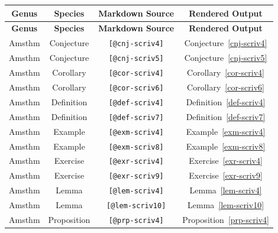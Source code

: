 \documentclass[
  12pt,
  a4paper,
  oneside,
  numbers=noenddot,
  titlepage,
  toclink=all,
  toc=bibliography]{scrbook}
\theoremstyle{definition}
\theoremstyle{definition}
\theoremstyle{definition}
\theoremstyle{plain}
\theoremstyle{plain}
\theoremstyle{plain}
\theoremstyle{plain}
\theoremstyle{plain}
\theoremstyle{remark}
\begin{document}
\hypertarget{tbl-scriv3}{}
\begin{longtable}[]{@{}cccc@{}}
\toprule\noalign{}
\textbf{Genus} & \textbf{Species} & \textbf{Markdown Source} &
\textbf{Rendered Output} \\
\midrule\noalign{}
\endfirsthead
\toprule\noalign{}
\textbf{Genus} & \textbf{Species} & \textbf{Markdown Source} &
\textbf{Rendered Output} \\
\midrule\noalign{}
\endhead
\bottomrule\noalign{}
\endlastfoot
Amsthm & Conjecture & \texttt{{[}@cnj-scriv4{]}} &
\protect\hypertarget{cite_7}{}{\label{cite_7}Conjecture~\ref{cnj-scriv4}} \\
Amsthm & Conjecture & \texttt{{[}@cnj-scriv5{]}} &
\protect\hypertarget{cite_8}{}{\label{cite_8}Conjecture~\ref{cnj-scriv5}} \\
Amsthm & Corollary & \texttt{{[}@cor-scriv4{]}} &
\protect\hypertarget{cite_9}{}{\label{cite_9}Corollary~\ref{cor-scriv4}} \\
Amsthm & Corollary & \texttt{{[}@cor-scriv6{]}} &
\protect\hypertarget{cite_10}{}{\label{cite_10}Corollary~\ref{cor-scriv6}} \\
Amsthm & Definition & \texttt{{[}@def-scriv4{]}} &
\protect\hypertarget{cite_11}{}{\label{cite_11}Definition~\ref{def-scriv4}} \\
Amsthm & Definition & \texttt{{[}@def-scriv7{]}} &
\protect\hypertarget{cite_12}{}{\label{cite_12}Definition~\ref{def-scriv7}} \\
Amsthm & Example & \texttt{{[}@exm-scriv4{]}} &
\protect\hypertarget{cite_13}{}{\label{cite_13}Example~\ref{exm-scriv4}} \\
Amsthm & Example & \texttt{{[}@exm-scriv8{]}} &
\protect\hypertarget{cite_14}{}{\label{cite_14}Example~\ref{exm-scriv8}} \\
Amsthm & Exercise & \texttt{{[}@exr-scriv4{]}} &
\protect\hypertarget{cite_15}{}{\label{cite_15}Exercise~\ref{exr-scriv4}} \\
Amsthm & Exercise & \texttt{{[}@exr-scriv9{]}} &
\protect\hypertarget{cite_16}{}{\label{cite_16}Exercise~\ref{exr-scriv9}} \\
Amsthm & Lemma & \texttt{{[}@lem-scriv4{]}} &
\protect\hypertarget{cite_17}{}{\label{cite_17}Lemma~\ref{lem-scriv4}} \\
Amsthm & Lemma & \texttt{{[}@lem-scriv10{]}} &
\protect\hypertarget{cite_18}{}{\label{cite_18}Lemma~\ref{lem-scriv10}} \\
Amsthm & Proposition & \texttt{{[}@prp-scriv4{]}} &
\protect\hypertarget{cite_19}{}{\label{cite_19}Proposition~\ref{prp-scriv4}} \\

\end{longtable}
\end{document}
